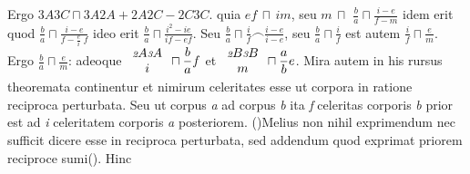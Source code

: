 %
\pend\pstart
Ergo ${\scriptstyle \textit{3}}A{\scriptstyle \textit{3}}C \sqcap {\scriptstyle \textit{3}}A{\scriptstyle \textit{2}}A + {\scriptstyle \textit{2}}A{\scriptstyle \textit{2}}C - {\scriptstyle \textit{2}}C{\scriptstyle \textit{3}}C$.
%
 quia $ef\, \sqcap\, im$, seu $m\, \sqcap $ %
%
%
$\displaystyle\frac{b}{a} \sqcap \displaystyle\frac{i-e}{f-m}$
%
idem erit quod
%
$\displaystyle\frac{b}{a} \sqcap \displaystyle\frac{i-e}{f-\displaystyle\frac{e}{i}\;f}$
%
ideo erit 
%
$\displaystyle\frac{b}{a} \sqcap \displaystyle\frac{i^2-ie}{if-ef}$.
%
Seu
%
$\displaystyle\frac{b}{a} \sqcap \displaystyle\frac{i}{f} \smallfrown \displaystyle\frac{i-e}{i-e}$,
%
seu
$\displaystyle\frac{b}{a} \sqcap \displaystyle\frac{i}{f}$ est autem
%
$\displaystyle\frac{i}{f} \sqcap \displaystyle\frac{e}{m}$.
%
Ergo 
%
$\displaystyle\frac{b}{a} \sqcap \displaystyle\frac{e}{m}$:
%
adeoque $\begin{array}{c} 
{\displaystyle\scriptstyle \textit{2}}A{\scriptstyle \textit{3}}A\\i\end{array} \sqcap \displaystyle\frac{b}{a}f$ %
et
%
$\begin{array}{c} 
{\displaystyle\scriptstyle \textit{2}}B{\scriptstyle \textit{3}}B\\m\end{array} \sqcap \displaystyle\frac{a}{b}e$.
%
%
Mira autem in his rursus theoremata\protect{} continentur
%
et nimirum celeritates esse ut corpora in ratione reciproca perturbata\protect{}. Seu ut corpus \textit{a} ad corpus \textit{b} ita
%
\textit{f} celeritas corporis \textit{b} prior est ad \textit{i} celeritatem corporis \textit{a} posteriorem. (\phantom)\hspace*{-1.2mm}Melius non nihil exprimendum nec sufficit dicere esse
in reciproca perturbata, sed addendum quod exprimat priorem reciproce sumi\phantom(\hspace*{-1.2mm}). Hinc
